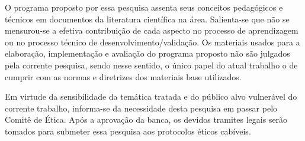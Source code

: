 


O programa proposto por essa pesquisa assenta seus conceitos pedagógicos e técnicos em documentos da literatura científica na área. Salienta-se que não se mensurou-se a efetiva contribuição de cada aspecto no processo de aprendizagem ou no processo técnico de desenvolvimento/validação. Os materiais usados para a elaboração, implementação e avaliação do programa proposto não são julgados pela corrente pesquisa, sendo nesse sentido, o único papel do atual trabalho o de cumprir com as normas e diretrizes dos materiais base utilizados. 

Em virtude da sensibilidade da temática tratada e do público alvo vulnerável do corrente trabalho, informa-se da necessidade desta pesquisa em passar pelo Comitê de Ética. Após a aprovação da banca, os devidos tramites legais serão tomados para submeter essa pesquisa aos protocolos éticos cabíveis. 



\newpage

 
 
 





